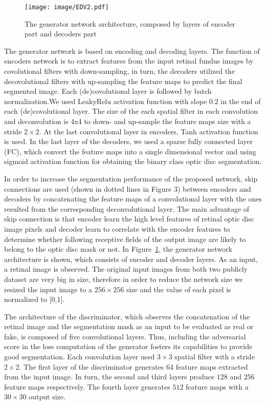 \documentclass{IOS-Book-Article}
\begin{document}
\begin{figure}[htp]
\centering
\texttt{[image: image/EDV2.pdf]}
\caption{ The generator network architecture, composed by layers of encoder part and decoders part}
\label{fig:figGenerator}
\end{figure}

The generator network is based on encoding and decoding layers. The function of encoders network is to extract features from the input retinal fundus images by covolutional filters with down-sampling, in turn, the decoders utilized the decovolutional filters with up-sampling the feature maps to predict the final segmented image. Each (de)covolutional layer is followed by batch normalization.We used LeakyRelu activation function with slope 0.2 in the end of each (de)covolutional layer. The size of the each spatial filter in each convolution and deconvolution is 4x4 to down- and up-sample the feature maps size with a stride $2\times 2$. At the last convolutional layer in encoders, Tanh activation function is used. In the last layer of the decoders, we used a sparse fully connected layer (FC), which convert the feature maps into a single dimensional vector and using sigmoid activation function for obtaining the binary class optic disc segmentation. 

In order to increase the segmentation performance of the proposed network, skip connections are used (shown in dotted lines in Figure 3) between encoders and decoders by concatenating the feature maps of a convolutional layer with the ones resulted from the corresponding deconvolutional layer. The main advantage of skip connection is that encoder learn the high level features of retinal optic disc image pixels and decoder learn to correlate with the encoder features to determine whether following receptive fields of the output image are likely to belong to the optic disc mask or not. In Figure~\ref{fig:figGenerator}, the generator network architecture is shown, which consists of encoder and decoder layers. As an input, a retinal image is observed. The original input images from both two publicly dataset are very big in size, therefore in order to reduce the network size we resized the input image to a $256\times 256$ size and the value of each pixel is normalized to [0,1].

The architecture of the discriminator, which observes the concatenation of the retinal image and the segmentation mask as an input to be evaluated as real or fake, is composed of five convolutional layers. Thus, including the adversarial score in the loss computation of the generator fosters its capabilities to provide good segmentation. Each convolution layer used $3\times 3$ spatial filter with a stride $2\times 2$. The first layer of the discriminator generates $64$ feature maps extracted from the input image. In turn, the second and third layers produce $128$ and $256$ feature maps respectively. The fourth layer generates $512$ feature maps with a $30\times 30$ output size. 
\end{document}
